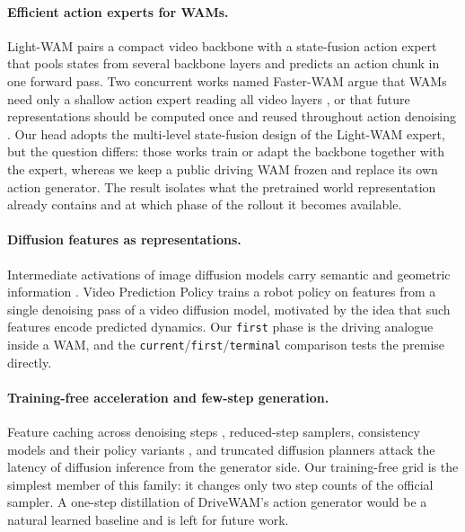 \documentclass[10pt]{article}
\newcommand{\first}{\texttt{first}}
\newcommand{\current}{\texttt{current}}
\newcommand{\terminal}{\texttt{terminal}}
\begin{document}
\paragraph{Efficient action experts for WAMs.} Light-WAM \citep{li2026lightwam} pairs a compact video backbone with a state-fusion action expert that pools states from several backbone layers and predicts an action chunk in one forward pass. Two concurrent works named Faster-WAM argue that WAMs need only a shallow action expert reading all video layers \citep{ma2026fasterwam}, or that future representations should be computed once and reused throughout action denoising \citep{zhao2026fasterwam}. Our head adopts the multi-level state-fusion design of the Light-WAM expert, but the question differs: those works train or adapt the backbone together with the expert, whereas we keep a public driving WAM frozen and replace its own action generator. The result isolates what the pretrained world representation already contains and at which phase of the rollout it becomes available.

\paragraph{Diffusion features as representations.} Intermediate activations of image diffusion models carry semantic and geometric information \citep{xiang2023diffusionfeatures,tang2023dift}. Video Prediction Policy \citep{hu2025vpp} trains a robot policy on features from a single denoising pass of a video diffusion model, motivated by the idea that such features encode predicted dynamics. Our \first{} phase is the driving analogue inside a WAM, and the \current{}/\first{}/\terminal{} comparison tests the premise directly.

\paragraph{Training-free acceleration and few-step generation.} Feature caching across denoising steps \citep{ma2024deepcache}, reduced-step samplers, consistency models \citep{song2023consistency} and their policy variants \citep{prasad2024consistencypolicy}, and truncated diffusion planners \citep{liao2025diffusiondrive} attack the latency of diffusion inference from the generator side. Our training-free grid is the simplest member of this family: it changes only two step counts of the official sampler. A one-step distillation of DriveWAM's action generator would be a natural learned baseline and is left for future work.
\end{document}
